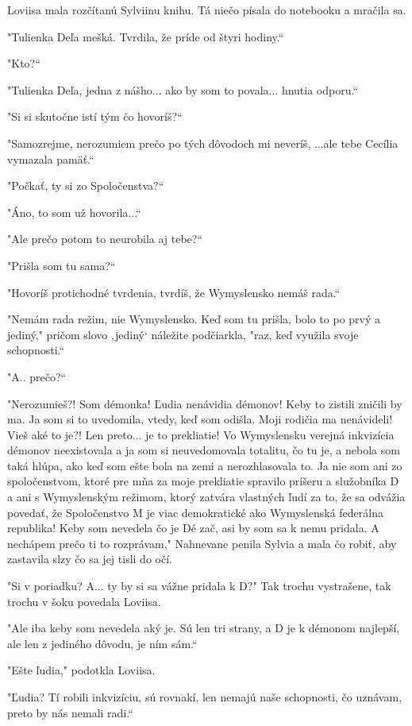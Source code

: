 \documentclass{book}
\begin{document}
Loviisa mala rozčítanú Sylviinu knihu. Tá niečo písala do notebooku a mračila sa.

"$ $Tulienka Deľa mešká. Tvrdila, že príde od štyri hodiny.“

"$ $Kto?“

"$ $Tulienka Deľa, jedna z nášho... ako by som to povala... hnutia odporu.“

"$ $Si si skutočne istí tým čo hovoríš?“

"$ $Samozrejme, nerozumiem prečo po tých dôvodoch mi neveríš, ...ale tebe Cecília vymazala pamäť.“

"$ $Počkať, ty si zo Spoločenstva?“

"$ $Áno, to som už hovorila...“

"$ $Ale prečo potom to neurobila aj tebe?“

"$ $Prišla som tu sama?“

"$ $Hovoríš protichodné tvrdenia, tvrdíš, že Wymyslensko nemáš rada.“

"$ $Nemám rada režim, nie Wymyslensko. Keď som tu prišla, bolo to po prvý a jediný,"$ $ pričom slovo ‚jediný‘ náležite podčiarkla, "$ $raz, keď využila svoje schopnosti.“

"$ $A.. prečo?“

"$ $Nerozumieš?! Som démonka! Ľudia nenávidia démonov! Keby to zistili zničili by ma. Ja som si to uvedomila, vtedy, keď som odišla. Moji rodičia ma nenávideli! Vieš aké to je?! Len preto... je to prekliatie! Vo Wymyslensku verejná inkvizícia démonov neexistovala a ja som si neuvedomovala totalitu, čo tu je, a nebola som taká hlúpa, ako keď som ešte bola na zemi a nerozhlasovala to. Ja nie som ani zo spoločenstvom, ktoré pre mňa za moje prekliatie spravilo príšeru a služobníka D a ani s Wymyslenským režimom, ktorý zatvára vlastných ľudí za to, že sa odvážia povedať, že Spoločenstvo M je viac demokratické ako Wymyslenská federálna republika! Keby som nevedela čo je Dé zač, asi by som sa k nemu pridala. A nechápem prečo ti to rozprávam,"$ $ Nahnevane penila Sylvia a mala čo robiť, aby zastavila slzy čo sa jej tisli do očí.

"$ $Si v poriadku? A... ty by si sa vážne pridala k D?"$ $ Tak trochu vystrašene, tak trochu v šoku povedala Loviisa.

"$ $Ale iba keby som nevedela aký je. Sú len tri strany, a D je k démonom najlepší, ale len z jediného dôvodu, je ním sám.“

"$ $Ešte ľudia,"$ $ podotkla Loviisa.

"$ $Ľudia? Tí robili inkvizíciu, sú rovnakí, len nemajú naše schopnosti, čo uznávam, preto by nás nemali radi.“
\end{document}
